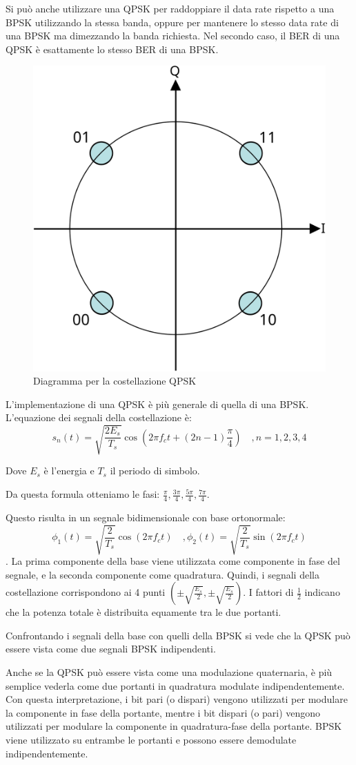 Si può anche utilizzare una \ac{QPSK} per raddoppiare il data rate rispetto a una \ac{BPSK} utilizzando la stessa banda, oppure per mantenere lo stesso data rate di una \ac{BPSK} ma dimezzando la banda richiesta.
Nel secondo caso, il \ac{BER} di una \ac{QPSK} è esattamente lo stesso \ac{BER} di una \ac{BPSK}.

\begin{figure}[htbp]
  \centering
  \includegraphics[width=0.4\linewidth]{./res/img/qpsk_diagram.png}
  \caption{Diagramma per la costellazione QPSK}
  \label{fig:qpsk-diagram}
\end{figure}

L'implementazione di una \ac{QPSK} è più generale di quella di una \ac{BPSK}.
L'equazione dei segnali della costellazione è:
$$s_n(t) = \sqrt{\frac{2 E_s}{T_s}} \cos(2 \pi f_c t + (2n - 1)\frac{\pi}{4}) \quad , n=1,2,3,4$$

Dove $E_s$ è l'energia e $T_s$ il periodo di simbolo.

Da questa formula otteniamo le fasi: $\frac{\pi}{4},\frac{3\pi}{4},\frac{5\pi}{4},\frac{7\pi}{4}$.

Questo risulta in un segnale bidimensionale con base ortonormale: $$\phi_1(t) = \sqrt{\frac{2}{T_s}} \cos(2 \pi f_c t) \quad, \phi_2(t) = \sqrt{\frac{2}{T_s}} \sin(2 \pi f_c t)$$.
La prima componente della base viene utilizzata come componente in fase del segnale, e la seconda componente come quadratura.
Quindi, i segnali della costellazione corrispondono ai 4 punti $(\pm \sqrt{\frac{E_s}{2}}, \pm \sqrt{\frac{E_s}{2}})$.
I fattori di $\frac{1}{2}$ indicano che la potenza totale è distribuita equamente tra le due portanti.

Confrontando i segnali della base con quelli della \ac{BPSK} si vede che la \ac{QPSK} può essere vista come due segnali \ac{BPSK} indipendenti.

Anche se la \ac{QPSK} può essere vista come una modulazione quaternaria, è più semplice vederla come due portanti in quadratura modulate indipendentemente.
Con questa interpretazione, i bit pari (o dispari) vengono utilizzati per modulare la componente in fase della portante, mentre i bit dispari (o pari) vengono utilizzati per modulare la componente in quadratura-fase della portante.
\ac{BPSK} viene utilizzato su entrambe le portanti e possono essere demodulate indipendentemente.

